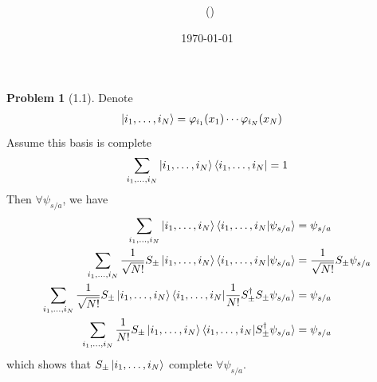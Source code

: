 \documentclass[twoside,11pt]{article}
\title{{\lms \Code \ \Ass}}
\author{\lms \name \ (\href{mailto:\mail}{\mail})}
\date{\sffamily \today}
\makeatletter
\theoremstyle{definition}
\newtheorem{problem}{Problem}
\theoremstyle{remark}
\newtheorem*{remark}{Remark}
\renewcommand{\maketitle}{\bgroup\setlength{\parindent}{0pt}
\begin{flushleft}
  \textbf{\Large\@title}

  \@author
\end{flushleft}\egroup
}
\makeatother
\begin{document}
\maketitle
\thispagestyle{title}


\begin{problem}[1.1]
Denote
\begin{align*}
    \ket{i_1,\dots,i_N} &= 
    \varphi_{i_1}(x_1)\cdots\varphi_{i_N}(x_N)
\end{align*}
Assume this basis is complete
\begin{align*}
    \sum_{i_1,\dots,i_N}
    \ket{i_1,\dots,i_N}
    \bra{i_1,\dots,i_N} = 1
\end{align*}
Then $\forall \psi_{s/a}$, we have
\begin{align*} 
    \sum_{i_1,\dots,i_N}
    \ket{i_1,\dots,i_N}
    \braket{i_1,\dots,i_N|\psi_{s/a}} &= \psi_{s/a}\\
    \sum_{i_1,\dots,i_N}
    \frac{1}{\sqrt{N!}}S_\pm\ket{i_1,\dots,i_N}
    \braket{i_1,\dots,i_N|\psi_{s/a}} 
    &= \frac{1}{\sqrt{N!}}S_\pm\psi_{s/a}\\
    \sum_{i_1,\dots,i_N}
    \frac{1}{\sqrt{N!}}S_\pm\ket{i_1,\dots,i_N}
    \braket{i_1,\dots,i_N|\frac{1}{N!}
    S_\pm^\dagger S_\pm\psi_{s/a}}
    &= \psi_{s/a}\\
    \sum_{i_1,\dots,i_N}
    \frac{1}{N!}S_\pm\ket{i_1,\dots,i_N}
    \braket{i_1,\dots,i_N|S_\pm^\dagger\psi_{s/a}}
    &= \psi_{s/a}
\end{align*}
which shows that $S_\pm\ket{i_1,\dots,i_N}$ complete
$\forall \psi_{s/a}$.

\end{problem}
\end{document}
